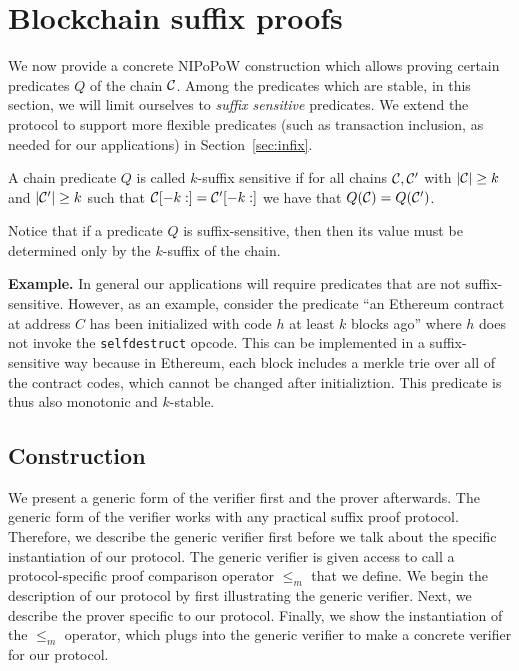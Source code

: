 \section{Blockchain suffix proofs}
We now provide a concrete NIPoPoW construction which allows proving certain
predicates $Q$ of the chain $\mathcal{C}$.
Among the predicates which are stable, in this section, we will limit ourselves to \textit{suffix sensitive} predicates.
We extend the protocol to support more flexible predicates (such as transaction inclusion, as needed for our applications) in Section~\ref{sec:infix}.

\begin{definition}
A chain predicate $Q$ is called $k$-\textnormal{suffix sensitive} if for all
chains $\mathcal{C}, \mathcal{C}'$ with $|\mathcal{C}| \geq k$ and $|\mathcal{C}'| \geq k$ such that
$\mathcal{C}[-k:] = \mathcal{C}'[-k:]$ we have that $Q(\mathcal{C}) = Q(\mathcal{C}')$.
\end{definition}

Notice that if a predicate $Q$ is suffix-sensitive, then then its value must be determined only by the $k$-suffix of the chain.

\noindent\textbf{Example.}
In general our applications will require predicates that are not suffix-sensitive. However, as an example, consider the predicate ``an Ethereum contract at address $C$ has been initialized with code $h$ at least $k$ blocks ago'' where $h$ does not invoke the \texttt{selfdestruct} opcode. This can be implemented in a suffix-sensitive way because in Ethereum, each block includes a merkle trie over all of the contract codes, which cannot be changed after initializtion. This predicate is thus also monotonic and $k$-stable.

\subsection{Construction}
We present a generic form of the verifier first and the prover afterwards. The
generic form of the verifier works with any practical suffix proof protocol.
Therefore, we describe the generic verifier first before we talk about the
specific instantiation of our protocol. The generic verifier is given access to
call a protocol-specific proof comparison operator $\leq_m$ that we define. We begin the
description of our protocol by first illustrating the generic verifier. Next, we
describe the prover specific to our protocol. Finally, we show the instantiation
of the $\leq_m$ operator, which plugs into the generic verifier to make a
concrete verifier for our protocol.

